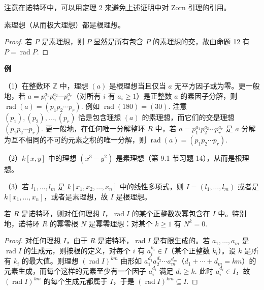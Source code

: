 注意在诺特环中，可以用定理 2 来避免上述证明中对 Zorn 引理的引用。

\begin{corollary}\label{cor:15.13}
素理想（从而极大理想）都是根理想。
\end{corollary}

\begin{proof}
若 \(P\) 是素理想，则 \(P\) 显然是所有包含 \(P\) 的素理想的交，故由命题 12 有 \(P = \operatorname{rad}P\).
\end{proof}

\noindent\textbf{例}

（1）在整数环 \(\mathbb{Z}\) 中，理想 \((a)\) 是根理想当且仅当 \(a\) 无平方因子或为零。更一般地，若 \(a = p_1^{a_1}p_2^{a_2}\cdots p_r^{a_r}\)（对所有 \(i\) 有 \(a_i \geq 1\)）是正整数 \(a\) 的素因子分解，则 \(\operatorname{rad}(a) = (p_1p_2\cdots p_r)\). 例如 \(\operatorname{rad}(180) = (30)\). 注意 \((p_1), (p_2), \ldots, (p_r)\) 恰是包含理想 \((a)\) 的素理想，而它们的交是理想 \((p_1p_2\cdots p_r)\). 更一般地，在任何唯一分解整环 \(R\) 中，若 \(a = p_1^{a_1}p_2^{a_2}\cdots p_r^{a_r}\) 是 \(a\) 分解为互不相同的不可约元素之积的唯一分解，则 \(\operatorname{rad}(a) = (p_1p_2\cdots p_r)\).

（2）\(k[x,y]\) 中的理想 \((x^3-y^2)\) 是素理想（第 9.1 节习题 14），从而是根理想。

（3）若 \(l_1, \ldots, l_m\) 是 \(k[x_1, x_2, \ldots, x_n]\) 中的线性多项式，则 \(I = (l_1, \ldots, l_m)\) 或者是 \(k[x_1, \ldots, x_n]\)，或者是素理想，故 \(I\) 是根理想。

\begin{proposition}\label{pro:15.14}
若 \(R\) 是诺特环，则对任何理想 \(I\)，\(\operatorname{rad}I\) 的某个正整数次幂包含在 \(I\) 中。特别地，诺特环 \(R\) 的幂零根 \(N\) 是幂零理想：对某个 \(k \geq 1\) 有 \(N^k = 0\).
\end{proposition}

\begin{proof}
对任何理想 \(I\)，由于 \(R\) 是诺特环，\(\operatorname{rad}I\) 是有限生成的。若 \(a_1, \ldots, a_m\) 是 \(\operatorname{rad}I\) 的生成元，则按根的定义，对每个 \(i\) 有 \(a_i^{k_i} \in I\)（某个正整数 \(k_i\)）。设 \(k\) 是所有 \(k_i\) 的最大值。则理想 \((\operatorname{rad}I)^{km}\) 由形如 \(a_1^{d_1}a_2^{d_2}\cdots a_m^{d_m}\)（\(d_1+\cdots+d_m = km\)）的元素生成，而每个这样的元素至少有一个因子 \(a_i^{d_i}\) 满足 \(d_i \geq k\). 此时 \(a_i^{d_i} \in I\)，故 \((\operatorname{rad}I)^{km}\) 的每个生成元都属于 \(I\)，于是 \((\operatorname{rad}I)^{km} \subseteq I\).
\end{proof}

